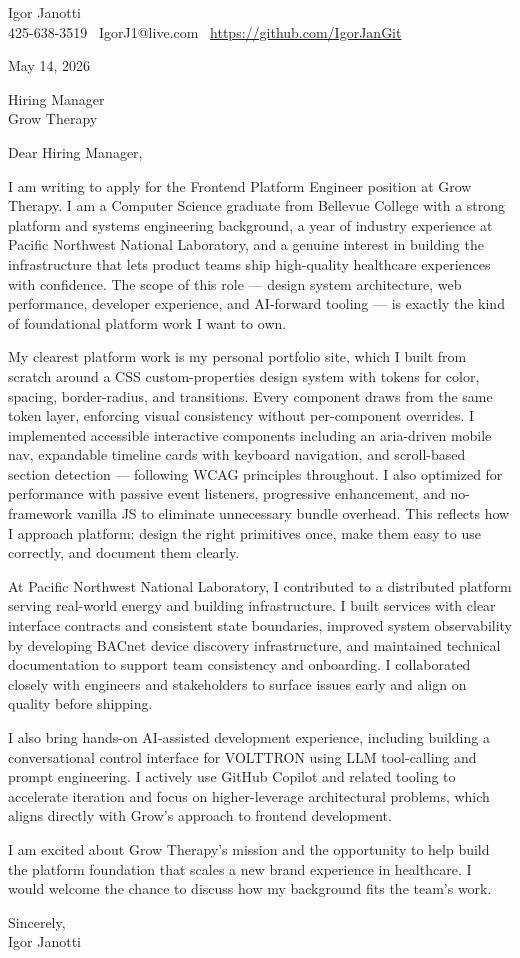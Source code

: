 \documentclass[11pt]{article}
\begin{document}
Igor Janotti\\
425-638-3519 \textbar\ IgorJ1@live.com \textbar\ \url{https://github.com/IgorJanGit}

May 14, 2026

Hiring Manager\\
Grow Therapy

Dear Hiring Manager,

I am writing to apply for the Frontend Platform Engineer position at Grow Therapy. I am a Computer Science graduate from Bellevue College with a strong platform and systems engineering background, a year of industry experience at Pacific Northwest National Laboratory, and a genuine interest in building the infrastructure that lets product teams ship high-quality healthcare experiences with confidence. The scope of this role — design system architecture, web performance, developer experience, and AI-forward tooling — is exactly the kind of foundational platform work I want to own.

My clearest platform work is my personal portfolio site, which I built from scratch around a CSS custom-properties design system with tokens for color, spacing, border-radius, and transitions. Every component draws from the same token layer, enforcing visual consistency without per-component overrides. I implemented accessible interactive components including an aria-driven mobile nav, expandable timeline cards with keyboard navigation, and scroll-based section detection — following WCAG principles throughout. I also optimized for performance with passive event listeners, progressive enhancement, and no-framework vanilla JS to eliminate unnecessary bundle overhead. This reflects how I approach platform: design the right primitives once, make them easy to use correctly, and document them clearly.

At Pacific Northwest National Laboratory, I contributed to a distributed platform serving real-world energy and building infrastructure. I built services with clear interface contracts and consistent state boundaries, improved system observability by developing BACnet device discovery infrastructure, and maintained technical documentation to support team consistency and onboarding. I collaborated closely with engineers and stakeholders to surface issues early and align on quality before shipping.

I also bring hands-on AI-assisted development experience, including building a conversational control interface for VOLTTRON using LLM tool-calling and prompt engineering. I actively use GitHub Copilot and related tooling to accelerate iteration and focus on higher-leverage architectural problems, which aligns directly with Grow's approach to frontend development.

I am excited about Grow Therapy's mission and the opportunity to help build the platform foundation that scales a new brand experience in healthcare. I would welcome the chance to discuss how my background fits the team's work.

Sincerely,\\
Igor Janotti
\end{document}
